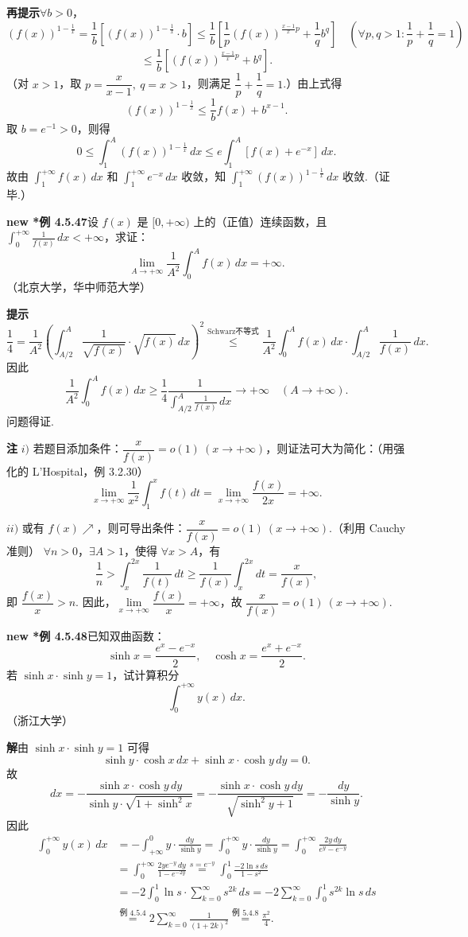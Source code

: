 \documentclass[UTF8, 12pt, fontset=fandol, oneside]{ctexart}
\begin{document}
\noindent\textbf{再提示}\quad $\forall b>0$，
\[
(f(x))^{1-\frac1x}
=\frac1b\left[(f(x))^{1-\frac1x}\cdot b\right]
\le\frac1b\left[\frac1p(f(x))^{\frac{x-1}x p}+\frac1q b^q\right]
\quad\left(\forall p,q>1:\frac1p+\frac1q=1\right)
\]
\[
\le\frac1b\left[(f(x))^{\frac{x-1}x p}+b^q\right].
\]
（对 $x>1$，取 $p=\dfrac x{x-1},\ q=x>1$，则满足 $\dfrac1p+\dfrac1q=1$.）由上式得
\[
(f(x))^{1-\frac1x}\le\frac1b f(x)+b^{x-1}.
\]
取 $b=e^{-1}>0$，则得
\[
0\le\int_1^A(f(x))^{1-\frac1x}\,dx
\le e\int_1^A[f(x)+e^{-x}]\,dx.
\]
故由 $\displaystyle\int_1^{+\infty}f(x)\,dx$ 和 $\displaystyle\int_1^{+\infty}e^{-x}\,dx$ 收敛，知
$\displaystyle\int_1^{+\infty}(f(x))^{1-\frac1x}\,dx$ 收敛.（证毕.）

\noindent\textbf{new *例 4.5.47}\quad 设 $f(x)$ 是 $[0,+\infty)$ 上的（正值）连续函数，且
$\displaystyle\int_0^{+\infty}\frac1{f(x)}\,dx<+\infty$，求证：
\[
\lim_{A\to+\infty}\frac1{A^2}\int_0^A f(x)\,dx=+\infty.
\]
（北京大学，华中师范大学）

\noindent\textbf{提示}\quad
\[
\frac14=\frac1{A^2}\left(\int_{A/2}^A\frac1{\sqrt{f(x)}}\cdot\sqrt{f(x)}\,dx\right)^2
\stackrel{\text{Schwarz不等式}}{\le}
\frac1{A^2}\int_0^A f(x)\,dx\cdot\int_{A/2}^A\frac1{f(x)}\,dx.
\]
因此
\[
\frac1{A^2}\int_0^A f(x)\,dx
\ge\frac14\frac1{\displaystyle\int_{A/2}^A\frac1{f(x)}\,dx}
\to+\infty\quad(A\to+\infty).
\]
问题得证.

\noindent\textbf{注}\quad
$i)$ 若题目添加条件：$\dfrac x{f(x)}=o(1)\ (x\to+\infty)$，则证法可大为简化：（用强化的 L'Hospital，例 3.2.30）
\[
\lim_{x\to+\infty}\frac1{x^2}\int_1^x f(t)\,dt
=\lim_{x\to+\infty}\frac{f(x)}{2x}=+\infty.
\]

$ii)$ 或有 $f(x)\nearrow$，则可导出条件：$\dfrac x{f(x)}=o(1)\ (x\to+\infty)$.（利用 Cauchy 准则）
$\forall n>0$，$\exists A>1$，使得 $\forall x>A$，有
\[
\frac1n>\int_x^{2x}\frac1{f(t)}\,dt
\ge\frac1{f(x)}\int_x^{2x}dt=\frac x{f(x)},
\]
即 $\dfrac{f(x)}x>n$. 因此，$\lim\limits_{x\to+\infty}\dfrac{f(x)}x=+\infty$，故
$\dfrac x{f(x)}=o(1)\ (x\to+\infty)$.

\noindent\textbf{new *例 4.5.48}\quad 已知双曲函数：
\[
\sinh x=\frac{e^x-e^{-x}}2,\quad \cosh x=\frac{e^x+e^{-x}}2.
\]
若 $\sinh x\cdot\sinh y=1$，试计算积分
\[
\int_0^{+\infty}y(x)\,dx.
\]
（浙江大学）

\noindent\textbf{解}\quad 由 $\sinh x\cdot\sinh y=1$ 可得
\[
\sinh y\cdot\cosh x\,dx+\sinh x\cdot\cosh y\,dy=0.
\]
故
\[
dx=-\frac{\sinh x\cdot\cosh y\,dy}{\sinh y\cdot\sqrt{1+\sinh^2x}}
=-\frac{\sinh x\cdot\cosh y\,dy}{\sqrt{\sinh^2y+1}}
=-\frac{dy}{\sinh y}.
\]
因此
\[
\begin{aligned}
\int_0^{+\infty}y(x)\,dx
&=-\int_{+\infty}^0 y\cdot\frac{dy}{\sinh y}
=\int_0^{+\infty}y\cdot\frac{dy}{\sinh y}
=\int_0^{+\infty}\frac{2y\,dy}{e^y-e^{-y}}\\
&=\int_0^{+\infty}\frac{2ye^{-y}\,dy}{1-e^{-2y}}
\stackrel{s=e^{-y}}{=}\int_0^1\frac{-2\ln s\,ds}{1-s^2}\\
&=-2\int_0^1\ln s\cdot\sum_{k=0}^{\infty}s^{2k}\,ds
=-2\sum_{k=0}^{\infty}\int_0^1s^{2k}\ln s\,ds\\
&\stackrel{\text{例 }4.5.4}{=}2\sum_{k=0}^{\infty}\frac1{(1+2k)^2}
\stackrel{\text{例 }5.4.8}{=}\frac{\pi^2}4.
\end{aligned}
\]
\end{document}
